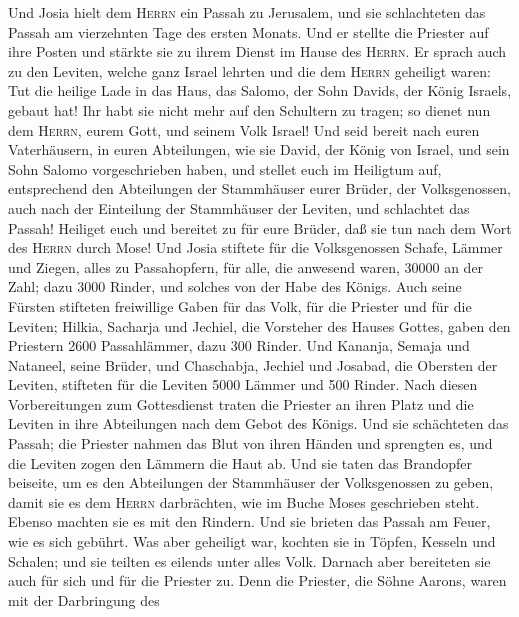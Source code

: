  Und Josia hielt dem \textsc{Herrn} ein Passah zu
Jerusalem, und sie schlachteten das Passah am vierzehnten Tage des
ersten Monats.  Und er stellte die Priester auf ihre
Posten und stärkte sie zu ihrem Dienst im Hause des \textsc{Herrn}.
 Er sprach auch zu den Leviten, welche ganz Israel lehrten
und die dem \textsc{Herrn} geheiligt waren: Tut die heilige Lade in das
Haus, das Salomo, der Sohn Davids, der König Israels, gebaut hat! Ihr
habt sie nicht mehr auf den Schultern zu tragen; so dienet nun dem
\textsc{Herrn}, eurem Gott, und seinem Volk Israel!  Und
seid bereit nach euren Vaterhäusern, in euren Abteilungen, wie sie
David, der König von Israel, und sein Sohn Salomo vorgeschrieben haben,
 und stellet euch im Heiligtum auf, entsprechend den
Abteilungen der Stammhäuser eurer Brüder, der Volksgenossen, auch nach
der Einteilung der Stammhäuser der Leviten,  und
schlachtet das Passah! Heiliget euch und bereitet zu für eure Brüder,
daß sie tun nach dem Wort des \textsc{Herrn} durch Mose! 
Und Josia stiftete für die Volksgenossen Schafe, Lämmer und Ziegen,
alles zu Passahopfern, für alle, die anwesend waren, 30000 an der Zahl;
dazu 3000 Rinder, und solches von der Habe des Königs. 
Auch seine Fürsten stifteten freiwillige Gaben für das Volk, für die
Priester und für die Leviten; Hilkia, Sacharja und Jechiel, die
Vorsteher des Hauses Gottes, gaben den Priestern 2600 Passahlämmer, dazu
300 Rinder.  Und Kananja, Semaja und Nataneel, seine
Brüder, und Chaschabja, Jechiel und Josabad, die Obersten der Leviten,
stifteten für die Leviten 5000 Lämmer und 500 Rinder. 
Nach diesen Vorbereitungen zum Gottesdienst traten die Priester an ihren
Platz und die Leviten in ihre Abteilungen nach dem Gebot des Königs.
 Und sie schächteten das Passah; die Priester nahmen das
Blut von ihren Händen und sprengten es, und die Leviten zogen den
Lämmern die Haut ab.  Und sie taten das Brandopfer
beiseite, um es den Abteilungen der Stammhäuser der Volksgenossen zu
geben, damit sie es dem \textsc{Herrn} darbrächten, wie im Buche Moses
geschrieben steht. Ebenso machten sie es mit den Rindern.
 Und sie brieten das Passah am Feuer, wie es sich
gebührt. Was aber geheiligt war, kochten sie in Töpfen, Kesseln und
Schalen; und sie teilten es eilends unter alles Volk. 
Darnach aber bereiteten sie auch für sich und für die Priester zu. Denn
die Priester, die Söhne Aarons, waren mit der Darbringung des
